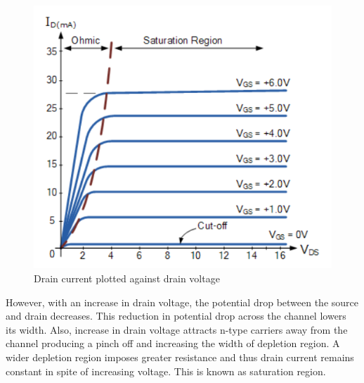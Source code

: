 \begin{figure}[H]
\centering
\includegraphics[scale=0.5]{./fig24} %
\caption{Drain current plotted against drain voltage}
\label{3.24} %
\end{figure}

\noindent However, with an increase in drain voltage, the potential drop between the source and drain decreases. This reduction in potential drop across the channel lowers its width. Also, increase in drain voltage attracts n-type carriers away from the channel producing a pinch off and increasing the width of depletion region. A wider depletion region imposes greater resistance and thus drain current remains constant in spite of increasing voltage. This is known as saturation region.

